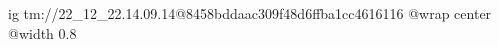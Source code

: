  
 
 
 
 

\qqSecOrig


\ifcmt
  ig tm://22_12_22.14.09.14@8458bddaac309f48d6ffba1cc4616116
  @wrap center
  @width 0.8
\fi

